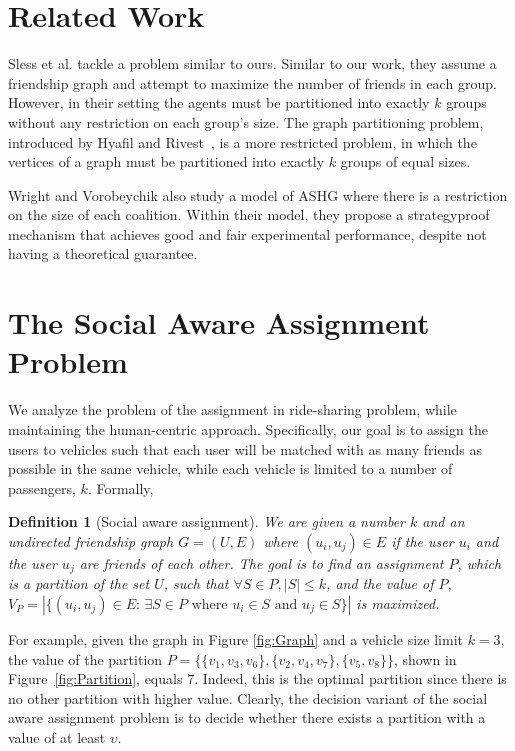 \documentclass[letterpaper]{article} %
\newtheorem{definition}{Definition}
\begin{document}
\section{Related Work}
Sless et al.  tackle a problem similar to ours. Similar to our work, they assume a friendship graph and attempt to maximize the number of friends in each group. However, in their setting the agents must be partitioned into exactly $k$ groups without any restriction on each group's size. The graph partitioning problem, introduced by Hyafil and Rivest~, is a more restricted problem, in which the vertices of a graph must be partitioned into exactly $k$ groups of equal sizes. %

Wright and Vorobeychik  also study a model of ASHG where there is a restriction on the size of each coalition. Within their model, they propose a strategyproof mechanism that achieves good and fair experimental performance, despite not having a theoretical guarantee.

\section{The Social Aware Assignment Problem}
We analyze the problem of the assignment in ride-sharing problem, while maintaining the human-centric approach.
Specifically, our goal is to assign the users to vehicles such that each user will be matched with as many friends as possible in the same vehicle, while each vehicle is limited to a number of passengers, $k$. Formally,


\begin{definition}[Social aware assignment]
We are given a number $k$ and an undirected friendship graph $G=(U,E)$ where $(u_i, u_j) \in E$ if the user $u_i$ and the user $u_j$ are friends of each other. The goal is to find an assignment $P$, which is a partition of the set $U$, such that $\forall S\in P, |S|\leq k$, and the value of $P$, $V_P = |\{(u_i, u_j) \in E \mbox{: } \exists S \in P \mbox{ where } u_i \in S \mbox{ and } u_j \in S\}|$ is maximized.
\end{definition}
For example, given the graph in Figure \ref{fig:Graph} and a vehicle size limit $k=3$, the value of the partition $P = \{\{v_1,v_3,v_6\}, \allowbreak \{v_2,v_4,v_7\}, \{v_5,v_8\}\}$, shown in Figure~\ref{fig:Partition}, equals $7$. Indeed, this is the optimal partition since there is no other partition with higher value.
Clearly, the decision variant of the social aware assignment problem is to decide whether there exists a partition with a value of at least $\upsilon$.
\end{document}
